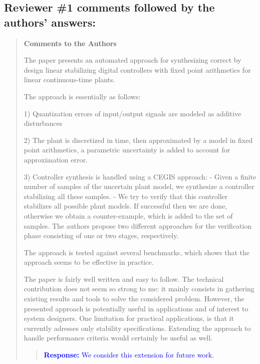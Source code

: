 \documentclass[11pt]{article}
\newcommand\vi{\vspace{\baselineskip}}
\begin{document}
\setcounter{page}{1}
\thispagestyle{empty}

\vspace*{1cm}

\vi
\subsection*{Reviewer \#1 comments followed by the authors' answers:}

\begin{quote}

{\bf Comments to the Authors}

The paper presents an automated approach for synthesizing correct by design linear stabilizing digital controllers with fixed point arithmetics for linear continuous-time plants. 

The approach is essentially as follows:

1) Quantization errors of input/output signals are modeled as additive disturbances

2) The plant is discretized in time, then approximated by a model in fixed point arithmetics, a parametric uncertainty is added to account for approximation error.

3) Controller synthesis is handled using a CEGIS approach:
    - Given a finite number of samples of the uncertain plant model, we synthesize a controller stabilizing all these samples. 
    - We try to verify that this controller stabilizes all possible plant models. If successful then we are done, otherwise we obtain a counter-example, which is added to the set of samples. The authors propose two different approaches for the verification phase consisting of one or two stages, respectively.

The approach is tested against several benchmarks, which shows that the approach seems to be effective in practice. 

The paper is fairly well written and easy to follow. The technical contribution does not seem so strong to me: it mainly consists in gathering existing results and tools to solve the considered problem. However, the presented approach is potentially useful in applications and of interest to system designers. One limitation for practical applications, is that it currently adresses only stability specifications. Extending the approach to handle performance criteria would certainly be useful as well. 

\begin{quote}
\textcolor{blue}{\textbf{Response:} 
We consider this extension for future work.}
\end{quote}


\end{quote}
\end{document}
